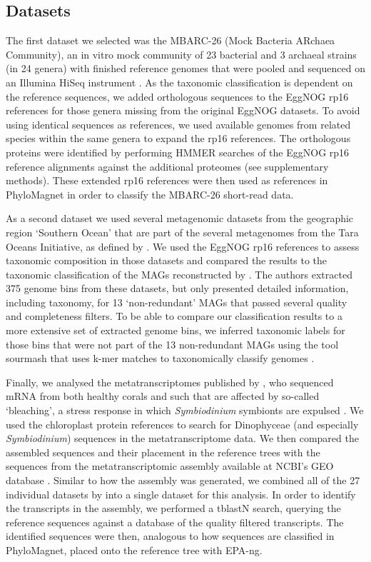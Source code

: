 \documentclass{bioinfo}
\begin{document}
\begin{methods}
\subsection{Datasets}
The first dataset we selected was the MBARC-26 (Mock Bacteria ARchaea Community), an in vitro mock community of 23 bacterial and 3 archaeal strains (in 24 genera) with finished reference genomes that were pooled and sequenced on an Illumina HiSeq instrument \citep{Singer2016}. As the taxonomic classification is dependent on the reference sequences, we added orthologous sequences to the EggNOG rp16 references for those genera missing from the original EggNOG datasets. To avoid using identical sequences as references, we used available genomes from related species within the same genera to expand the rp16 references. The orthologous proteins were identified by performing HMMER \citep[v3.1b2;][]{Eddy2011} searches of the EggNOG rp16 reference alignments against the additional proteomes (see supplementary methods). These extended rp16 references were then used as references in PhyloMagnet in order to classify the MBARC-26 short-read data. 

As a second dataset we used several metagenomic datasets from the geographic region ‘Southern Ocean’ that are part of the several metagenomes from the Tara Oceans Initiative, as defined by \cite{Delmont2018}. We used the EggNOG rp16 references to assess taxonomic composition in those datasets and compared the results to the taxonomic classification of the MAGs reconstructed by \cite{Delmont2018}. The authors extracted 375 genome bins from these datasets, but only presented detailed information, including taxonomy, for 13 ‘non-redundant’ MAGs that passed several quality and completeness filters. To be able to compare our classification results to a more extensive set of extracted genome bins, we inferred taxonomic labels for those bins that were not part of the 13 non-redundant MAGs using the tool sourmash that uses k-mer matches to taxonomically classify genomes \citep{TitusBrown2016}.

Finally, we analysed the metatranscriptomes published by \citet{Frazier2017}, who sequenced mRNA from both healthy corals and such that are affected by so-called ‘bleaching’, a stress response in which \textit{Symbiodinium} symbionts are expulsed \citep{Howe2008}. We used the chloroplast protein references to search for Dinophyceae (and especially \textit{Symbiodinium}) sequences in the metatranscriptome data. We then compared the assembled sequences and their placement in the reference trees with the sequences from the metatranscriptomic assembly available at NCBI’s GEO database \citep{Barrett2012}. Similar to how the assembly was generated, we combined all of the 27 individual datasets by \citet{Frazier2017} into a single dataset for this analysis. In order to identify the transcripts in the assembly, we performed a tblastN search, querying the reference sequences against a database of the quality filtered transcripts. The identified sequences were then, analogous to how sequences are classified in PhyloMagnet, placed onto the reference tree with EPA-ng. 


\end{methods}
\end{document}
